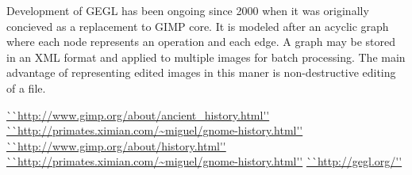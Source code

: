 \documentclass[a4 paper, 12pt]{article}
\begin{document}
	Development of GEGL has been ongoing since 2000 when it was originally
	concieved as a replacement to GIMP core. It is modeled after an acyclic
	graph where each node represents an operation and each edge. A graph may be
	stored in an XML format and applied to multiple images for batch
	processing. The main advantage of representing edited images in this maner
	is non-destructive editing of a file.
	
\begin{thebibliography}{12}
		\url{``http://www.gimp.org/about/ancient_history.html''}
		\url{``http://primates.ximian.com/~miguel/gnome-history.html''}
		\url{``http://www.gimp.org/about/history.html''}
		\url{``http://primates.ximian.com/~miguel/gnome-history.html''}
		\url{``http://gegl.org/''}
\end{thebibliography}
\end{document}
